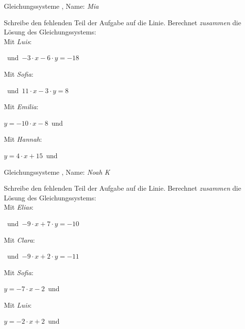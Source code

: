\newpage
\begin{center}\large Gleichungssysteme
, Name: \emph{Mia}\end{center}
Schreibe den fehlenden Teil der Aufgabe auf die Linie. Berechnet \emph{zusammen} die Lösung des Gleichungssystems:
\\
\vfill Mit \emph{Luis}:
\begin{center}\underline{}
\mbox{ }und\mbox{ }$-3\cdot x-6\cdot y=-18$\end{center}
\vfill Mit \emph{Sofia}:
\begin{center}\underline{}
\mbox{ }und\mbox{ }$11\cdot x-3\cdot y=8$\end{center}
\vfill Mit \emph{Emilia}:
\begin{center}$y=-10\cdot x-8$\mbox{ }und\mbox{ }\underline{}
\end{center}
\vfill Mit \emph{Hannah}:
\begin{center}$y=4\cdot x+15$\mbox{ }und\mbox{ }\underline{}
\end{center}
\newpage
\begin{center}\large Gleichungssysteme
, Name: \emph{Noah K}\end{center}
Schreibe den fehlenden Teil der Aufgabe auf die Linie. Berechnet \emph{zusammen} die Lösung des Gleichungssystems:
\\
\vfill Mit \emph{Elias}:
\begin{center}\underline{}
\mbox{ }und\mbox{ }$-9\cdot x+7\cdot y=-10$\end{center}
\vfill Mit \emph{Clara}:
\begin{center}\underline{}
\mbox{ }und\mbox{ }$-9\cdot x+2\cdot y=-11$\end{center}
\vfill Mit \emph{Sofia}:
\begin{center}$y=-7\cdot x-2$\mbox{ }und\mbox{ }\underline{}
\end{center}
\vfill Mit \emph{Luis}:
\begin{center}$y=-2\cdot x+2$\mbox{ }und\mbox{ }\underline{}
\end{center}
